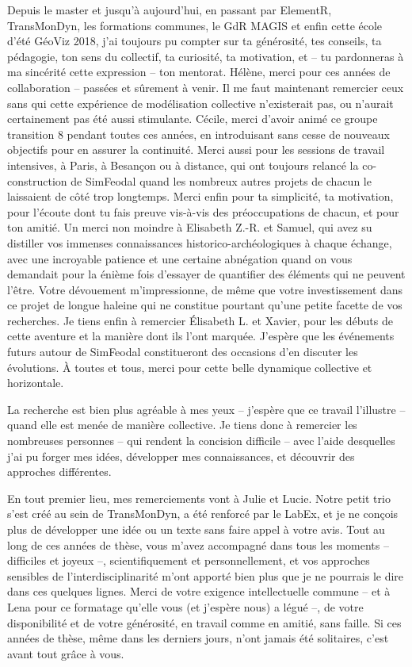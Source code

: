 Depuis le master et jusqu'à aujourd'hui, en passant par ElementR, TransMonDyn, les formations communes, le GdR MAGIS et enfin cette école \og d'été\fg{} GéoViz 2018, j'ai toujours pu compter sur ta générosité, tes conseils, ta pédagogie, ton sens du collectif, ta curiosité, ta motivation, et -- tu pardonneras à ma sincérité cette expression -- ton mentorat.
Hélène, merci pour ces années de collaboration -- passées et sûrement à venir.
\clearpage
Il me faut maintenant remercier ceux sans qui cette expérience de modélisation collective n'existerait pas, ou n'aurait certainement pas été aussi stimulante.
Cécile, merci d'avoir animé ce groupe \og transition 8\fg{} pendant toutes ces années, en introduisant sans cesse de nouveaux objectifs pour en assurer la continuité.
Merci aussi pour les sessions de travail intensives, à Paris, à Besançon ou à distance, qui ont toujours relancé la co-construction de SimFeodal quand les nombreux autres projets de chacun le laissaient de côté trop longtemps.
Merci enfin pour ta simplicité, ta motivation, pour l'écoute dont tu fais preuve vis-à-vis des préoccupations de chacun, et pour ton amitié.
Un merci non moindre à Elisabeth Z.-R. et Samuel, qui avez su distiller vos immenses connaissances historico-archéologiques à chaque échange, avec une incroyable patience et une certaine abnégation quand on vous demandait pour la énième fois d'essayer de quantifier des éléments qui ne peuvent l'être.
Votre dévouement m'impressionne, de même que votre investissement dans ce projet de longue haleine qui ne constitue pourtant qu'une petite facette de vos recherches.
Je tiens enfin à remercier Élisabeth L. et Xavier, pour les débuts de cette aventure et la manière dont ils l'ont marquée.
J'espère que les événements futurs autour de SimFeodal constitueront des occasions d'en discuter les évolutions.
À toutes et tous, merci pour cette belle dynamique collective et horizontale.
%

La recherche est bien plus agréable à mes yeux -- j'espère que ce travail l'illustre -- quand elle est menée de manière collective.
Je tiens donc à remercier les nombreuses personnes -- qui rendent la concision difficile --  avec l'aide desquelles j'ai pu forger mes idées, développer mes connaissances, et découvrir des approches différentes.

En tout premier lieu, mes remerciements vont à Julie et Lucie.
Notre petit trio s'est créé au sein de TransMonDyn, a été renforcé par le LabEx, et je ne conçois plus de développer une idée ou un texte sans faire appel à votre avis.
Tout au long de ces années de thèse, vous m'avez accompagné dans tous les moments -- difficiles et joyeux --, scientifiquement et personnellement, et vos approches sensibles de l'interdisciplinarité m'ont apporté bien plus que je ne pourrais le dire dans ces quelques lignes.
Merci de votre exigence intellectuelle commune -- et à Lena pour ce \og formatage\fg{} qu'elle vous (et j'espère nous) a légué --, de votre disponibilité et de votre générosité, en travail comme en amitié, sans faille.
Si ces années de thèse, même dans les derniers jours, n'ont jamais été solitaires, c'est avant tout grâce à vous.

